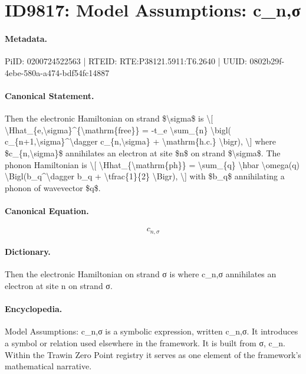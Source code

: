 \section*{ID9817: Model Assumptions: c\_n,σ}
\paragraph{Metadata.}
PiID: 0200724522563 | RTEID: RTE:P38121.5911:T6.2640 | UUID: 0802b29f-4ebe-580a-a474-bdf54fc14887

\paragraph{Canonical Statement.}
Then the electronic Hamiltonian on strand \$\textbackslash{}sigma\$ is \textbackslash{}[ \textbackslash{}Hhat\_\{e,\textbackslash{}sigma\}\textasciicircum{}\{\textbackslash{}mathrm\{free\}\} = -t\_e \textbackslash{}sum\_\{n\} \textbackslash{}bigl( c\_\{n+1,\textbackslash{}sigma\}\textasciicircum{}\textbackslash{}dagger c\_\{n,\textbackslash{}sigma\} + \textbackslash{}mathrm\{h.c.\} \textbackslash{}bigr), \textbackslash{}] where \$c\_\{n,\textbackslash{}sigma\}\$ annihilates an electron at site \$n\$ on strand \$\textbackslash{}sigma\$. The phonon Hamiltonian is \textbackslash{}[ \textbackslash{}Hhat\_\{\textbackslash{}mathrm\{ph\}\} = \textbackslash{}sum\_\{q\} \textbackslash{}hbar \textbackslash{}omega(q) \textbackslash{}Bigl(b\_q\textasciicircum{}\textbackslash{}dagger b\_q + \textbackslash{}tfrac\{1\}\{2\} \textbackslash{}Bigr), \textbackslash{}] with \$b\_q\$ annihilating a phonon of wavevector \$q\$.

\paragraph{Canonical Equation.}
\[
c_{n,\sigma}
\]

\paragraph{Dictionary.}
Then the electronic Hamiltonian on strand σ is where c\_n,σ annihilates an electron at site n on strand σ.

\paragraph{Encyclopedia.}
Model Assumptions: c\_n,σ is a symbolic expression, written c\_n,σ. It introduces a symbol or relation used elsewhere in the framework. It is built from σ, c\_n. Within the Trawin Zero Point registry it serves as one element of the framework's mathematical narrative.

